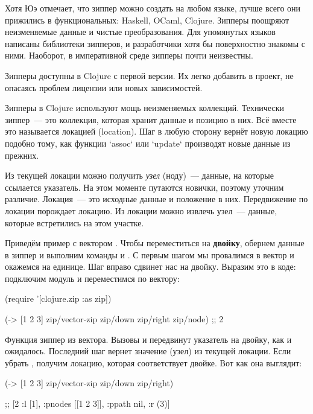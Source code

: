Хотя Юэ отмечает, что зиппер можно создать на любом языке, лучше всего они
прижились в функциональных: Haskell, OCaml, Clojure. Зипперы поощряют
неизменяемые данные и чистые преобразования. Для упомянутых языков написаны
библиотеки зипперов, и разработчики хотя бы поверхностно знакомы с
ними. Наоборот, в императивной среде зипперы почти неизвестны.

Зипперы доступны в Clojure с первой версии. Их легко добавить в проект, не
опасаясь проблем лицензии или новых зависимостей.

Зипперы в Clojure используют мощь неизменяемых коллекций. Технически зиппер~---
это коллекция, которая хранит данные и позицию в них. Всё вместе это называется
локацией (location). Шаг в любую сторону вернёт новую локацию подобно тому, как
функции `assoc` или `update` производят новые данные из прежних.

Из текущей локации можно получить \emph{узел} (ноду)~--- данные, на которые ссылается
указатель. На этом моменте путаются новички, поэтому уточним различие. Локация~---
это исходные данные и положение в них. Передвижение по локации порождает
локацию. Из локации можно извлечь узел~--- данные, которые встретились на этом
участке.

Приведём пример с вектором \code{[1 2 3]}. Чтобы переместиться на \textbf{двойку}, обернем
данные в зиппер и выполним команды  и . С первым шагом мы
провалимся в вектор и окажемся на единице. Шаг вправо сдвинет нас на
двойку. Выразим это в коде: подключим модуль  и переместимся по
вектору:

\begin{english}
  \begin{clojure}
(require '[clojure.zip :as zip])

(-> [1 2 3]
    zip/vector-zip
    zip/down
    zip/right
    zip/node)
;; 2
  \end{clojure}
\end{english}

Функция  зиппер из вектора. Вызовы  и
 передвинут указатель на двойку, как и ожидалось. Последний шаг
 вернет значение (узел) из текущей локации. Если убрать ,
получим локацию, которая соответствует двойке. Вот как она выглядит:

\begin{english}
  \begin{clojure}
(-> [1 2 3]
    zip/vector-zip
    zip/down
    zip/right)

;; [2 {:l [1], :pnodes [[1 2 3]], :ppath nil, :r (3)}]
  \end{clojure}
\end{english}

